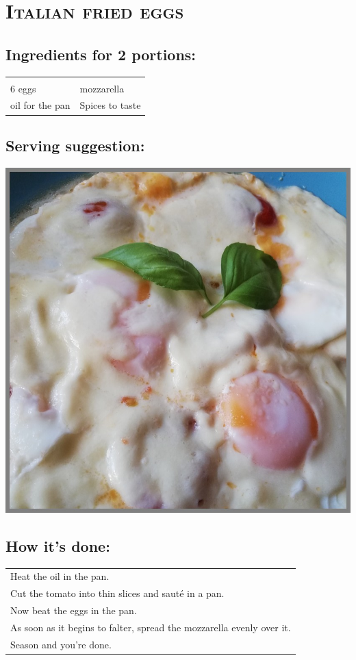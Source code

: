 \section{\textsc{Italian fried eggs}}

\subsection*{Ingredients for 2 portions:}

\begin{tabular}{p{7.5cm} p{7.5cm}}
	& \\
	6 eggs & mozzarella \\
	oil for the pan & Spices to taste
\end{tabular}

\subsection*{Serving suggestion:}

\includegraphics[width=\textwidth]{img/spiegelei.jpg} \cite{itaspiegelei}

\subsection*{How it's done:}

\begin{tabular}{p{15cm}}
	\\
  Heat the oil in the pan.\\
  Cut the tomato into thin slices and sauté in a pan.\\
  Now beat the eggs in the pan.\\
  As soon as it begins to falter, spread the mozzarella evenly over it.\\
  Season and you're done.
\end{tabular}
